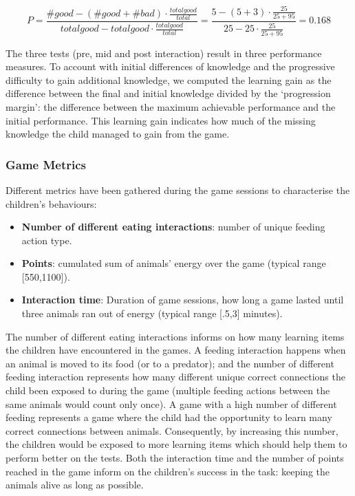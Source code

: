 \begin{equation}
P=\frac{\#good-(\#good+\#bad) \cdot \frac{total good}{total}}{total good - total good \cdot \frac{total good}{total}} = \frac{5-(5+3) \cdot \frac{25}{25+95}}{25 - 25 \cdot \frac{25}{25+95}}=0.168
\end{equation}
			
The three tests (pre, mid and post interaction) result in three performance measures. To account with initial differences of knowledge and the progressive difficulty to gain additional knowledge, we computed the learning gain as the difference between the final and initial knowledge divided by the `progression margin': the difference between the maximum achievable performance and the initial performance. This learning gain indicates how much of the missing knowledge the child managed to gain from the game.
			
\subsubsection{Game Metrics}
Different metrics have been gathered during the game sessions to characterise the children's behaviours:
\begin{itemize}
	\item \textbf{Number of different eating interactions}: number of unique feeding action type.
	\item \textbf{Points}: cumulated sum of animals' energy over the game (typical range [550,1100]).
	\item \textbf{Interaction time}: Duration of game sessions, how long a game lasted until three animals ran out of energy (typical range [.5,3] minutes).
\end{itemize}

The number of different eating interactions informs on how many learning items the children have encountered in the games. A feeding interaction happens when an animal is moved to its food (or to a predator); and the number of different feeding interaction represents how many different unique correct connections the child been exposed to during the game (multiple feeding actions between the same animals would count only once). A game with a high number of different feeding represents a game where the child had the opportunity to learn many correct connections between animals. Consequently, by increasing this number, the children would be exposed to more learning items which should help them to perform better on the tests. Both the interaction time and the number of points reached in the game inform on the children's success in the task: keeping the animals alive as long as possible. 

